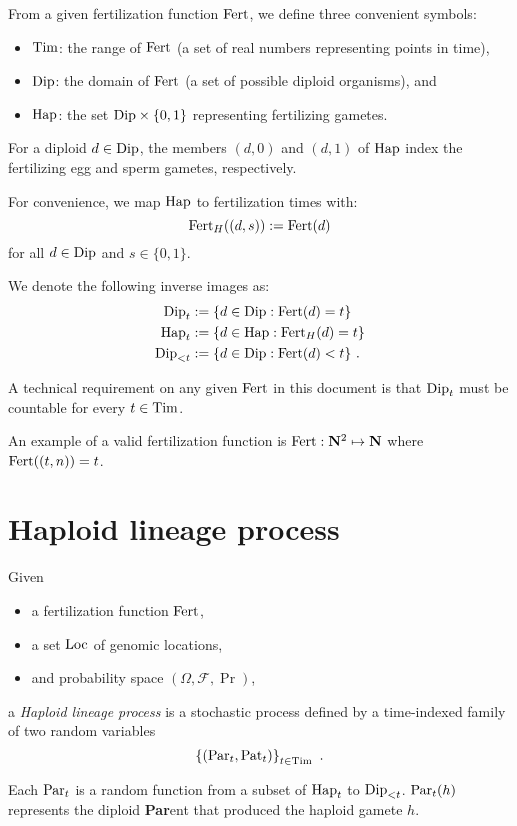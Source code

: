 \documentclass{article}
\begin{document}
From a given fertilization function $\mathrm{Fert}$, we define three convenient symbols:
\begin{itemize}
\item
  $\mathrm{Tim}$: the range of $\mathrm{Fert}$ (a set of real numbers representing points in time),
\item
  $\mathrm{Dip}$: the domain of $\mathrm{Fert}$ (a set of possible diploid organisms), and
\item
  $\mathrm{Hap}$: the set $\mathrm{Dip} \times \{0, 1 \}$ representing fertilizing gametes.
\end{itemize}

For a diploid $d \in \mathrm{Dip}$, the members $(d, 0)$ and $(d, 1)$ of $\mathrm{Hap}$ index the
fertilizing egg and sperm gametes, respectively.

For convenience, we map $\mathrm{Hap}$ to fertilization times with:
$$
  \mathrm{Fert}_H((d, s)) := \mathrm{Fert}(d)
$$
for all $d \in \mathrm{Dip}$ and $s \in \{0, 1\}$.

We denote the following inverse images as:
$$
\begin{aligned}
\mathrm{Dip}_t & := \{ d \in \mathrm{Dip} : \mathrm{Fert}(d) = t \}  \\
\mathrm{Hap}_t & := \{ d \in \mathrm{Hap} : \mathrm{Fert}_H(d) = t \}  \\
\mathrm{Dip}_{<t} & := \{ d \in \mathrm{Dip} : \mathrm{Fert}(d) < t \}
\text{ .}
\end{aligned}
$$

A technical requirement on any given $\mathrm{Fert}$ in this document is that $\mathrm{Dip}_t$ must be
countable for every $t \in \mathrm{Tim}$.

An example of a valid fertilization function is $\mathrm{Fert} : \mathbf{N}^2 \mapsto \mathbf{N}$
where $\mathrm{Fert}( (t, n) ) = t$.


\section{Haploid lineage process}

Given 
\begin{itemize}
\item
  a fertilization function $\mathrm{Fert}$,
\item
  a set $\mathrm{Loc}$ of genomic locations,
\item
  and probability space $(\Omega, \mathcal{F}, \Pr)$,
\end{itemize}
a \emph{Haploid lineage process} is a stochastic process defined by a time-indexed
family of two random variables
$$
 \left\{ (\mathrm{Par}_t, \mathrm{Pat}_t) \right\}_{t \in \mathrm{Tim}}
\text{ .}
$$

Each $\mathrm{Par}_t$ is a random function from a subset of $\mathrm{Hap}_t$ to $\mathrm{Dip}_{<t}$.
$\mathrm{Par}_t(h)$ represents the diploid \textbf{Par}ent that produced the haploid gamete $h$.
\end{document}
